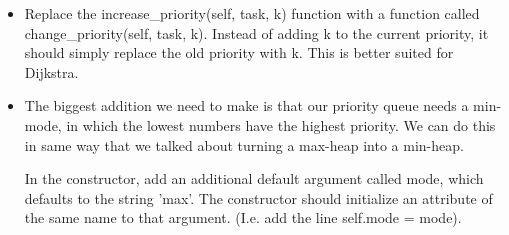\documentclass[12pt]{article}
\begin{document}
\begin{enumerate}
\begin{itemize}
        \begin{itemize}
            \item Replace the increase\_priority(self, task, k) function with a function called change\_priority(self, task, k). Instead of adding k to the current priority, it should simply replace the old priority with k. This is better suited for Dijkstra. 
            \item The biggest addition we need to make is that our priority queue needs a min-mode, in which the lowest numbers have the highest priority. We can do this in same way that we talked about turning a max-heap into a min-heap. 
            
            In the constructor, add an additional default argument called mode, which defaults to the string 'max'. The constructor should initialize an attribute of the same name to that argument. (I.e. add the line self.mode = mode). 


\end{itemize}
\end{itemize}
\end{enumerate}
\end{document}
